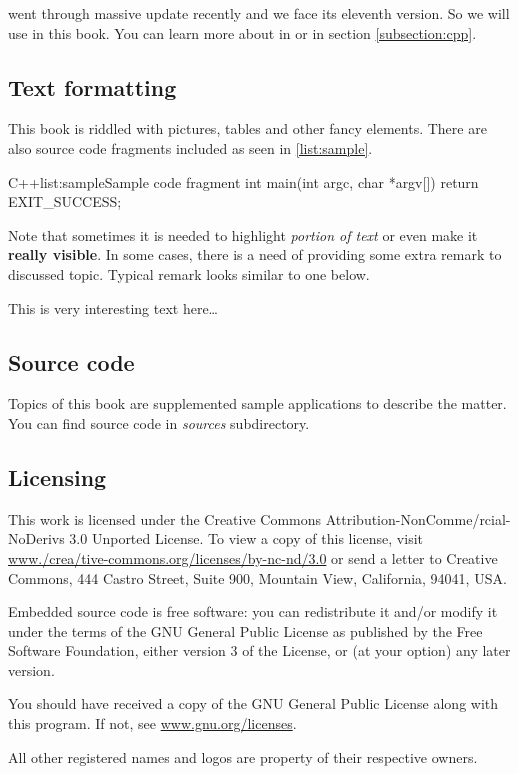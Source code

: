 \cpp went through massive update recently and we face its eleventh version. So we will use  in this book. You can learn more about  in \citep{various:cppstandard} or in section \ref{subsection:cpp}.

\subsection*{Text formatting}
This book is riddled with pictures, tables and other fancy elements. There are also source code fragments included as seen in \autoref{list:sample}.

\begin{fdoccode}{C++}{list:sample}{Sample code fragment}
int main(int argc, char *argv[]) {
	return EXIT_SUCCESS;
}
\end{fdoccode}

Note that sometimes it is needed to highlight \emph{portion of text} or even make it \textbf{really visible}. In some cases, there is a need of providing some extra remark to discussed topic. Typical remark looks similar to one below.

\begin{fdocextra}
This is very interesting text here\ldots
\end{fdocextra}

\subsection*{Source code}
Topics of this book are supplemented sample applications to describe the matter. You can find source code in \textit{sources} subdirectory.

\subsection*{Licensing}
This work is licensed under the Creative Commons Attribution-NonComme\-/rcial-NoDerivs 3.0 Unported License. To view a copy of this license, visit \href{http://www.creativecommons.org/licenses/by-nc-nd/3.0}{www.\-/crea\-/tive-commons.org/licenses/by-nc-nd/3.0} or send a letter to Creative Commons, 444 Castro Street, Suite 900, Mountain View, California, 94041, USA.

Embedded \cpp source code is free software: you can redistribute it and/or modify it under the terms of the GNU General Public License as published by the Free Software Foundation, either version 3 of the License, or (at your option) any later version.

You should have received a copy of the GNU General Public License along with this program. If not, see \href{http://www.gnu.org/licenses}{www.gnu.org/licenses}.

All other registered names and logos are property of their respective owners.